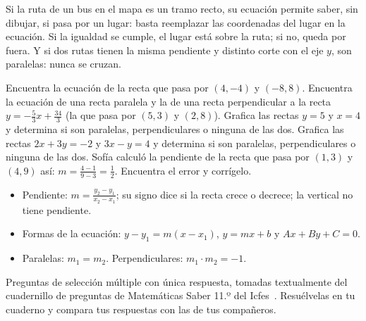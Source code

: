 \documentclass[11pt]{article}
\begin{document}
\begin{aplicacion}
Si la ruta de un bus en el mapa es un tramo recto, su ecuación permite saber,
sin dibujar, si pasa por un lugar: basta reemplazar las coordenadas del lugar
en la ecuación. Si la igualdad se cumple, el lugar está sobre la ruta; si no,
queda por fuera. Y si dos rutas tienen la misma pendiente y distinto corte con
el eje $y$, son paralelas: nunca se cruzan.
\end{aplicacion}

\begin{preguntas}
\pregunta Encuentra la ecuación de la recta que pasa por $(4, -4)$ y
$(-8, 8)$.
\espacio{2.5cm}
\pregunta Encuentra la ecuación de una recta paralela y la de una recta
perpendicular a la recta $y = -\frac{5}{3}x + \frac{34}{3}$ (la que pasa por
$(5, 3)$ y $(2, 8)$).
\espacio{3cm}
\pregunta Grafica las rectas $y = 5$ y $x = 4$ y determina si son paralelas,
perpendiculares o ninguna de las dos.
\espacio{3cm}
\pregunta Grafica las rectas $2x + 3y = -2$ y $3x - y = 4$ y determina si son
paralelas, perpendiculares o ninguna de las dos.
\espacio{3cm}
\pregunta Sofía calculó la pendiente de la recta que pasa por $(1, 3)$ y
$(4, 9)$ así: $m = \frac{4 - 1}{9 - 3} = \frac{1}{2}$. Encuentra el error y
corrígelo.
\espacio{2.5cm}
\end{preguntas}

\begin{resumen}
\begin{itemize}
  \item Pendiente: $m = \frac{y_2 - y_1}{x_2 - x_1}$; su signo dice si la
        recta crece o decrece; la vertical no tiene pendiente.
  \item Formas de la ecuación: $y - y_1 = m(x - x_1)$, $y = mx + b$ y
        $Ax + By + C = 0$.
  \item Paralelas: $m_1 = m_2$. Perpendiculares: $m_1 \cdot m_2 = -1$.
\end{itemize}
\end{resumen}


\begin{instrucciones}
Preguntas de selección múltiple con única respuesta, tomadas textualmente del
cuadernillo de preguntas de Matemáticas Saber 11.º del Icfes~\cite{icfes}.
Resuélvelas en tu cuaderno y compara tus respuestas con las de tus compañeros.
\end{instrucciones}
\end{document}
